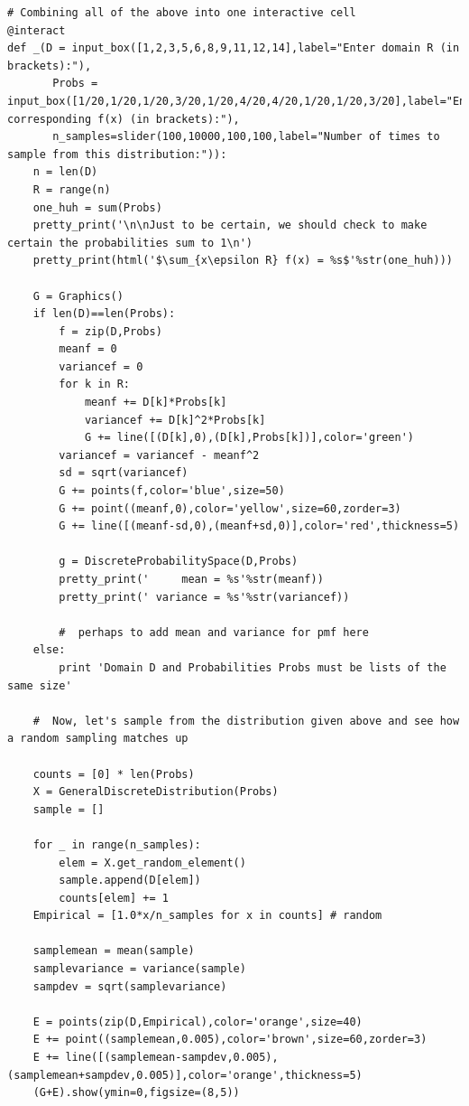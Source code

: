 \documentclass[10pt,]{book}
\theoremstyle{plain}
\theoremstyle{definition}
\theoremstyle{definition}
\theoremstyle{definition}
\numberwithin{equation}{section}
\begin{document}
\begin{lstlisting}[style=sageinput]
# Combining all of the above into one interactive cell
@interact
def _(D = input_box([1,2,3,5,6,8,9,11,12,14],label="Enter domain R (in brackets):"), 
       Probs = input_box([1/20,1/20,1/20,3/20,1/20,4/20,4/20,1/20,1/20,3/20],label="Enter corresponding f(x) (in brackets):"),
       n_samples=slider(100,10000,100,100,label="Number of times to sample from this distribution:")):
    n = len(D)
    R = range(n)
    one_huh = sum(Probs)
    pretty_print('\n\nJust to be certain, we should check to make certain the probabilities sum to 1\n')
    pretty_print(html('$\sum_{x\epsilon R} f(x) = %s$'%str(one_huh)))
    
    G = Graphics()
    if len(D)==len(Probs):
        f = zip(D,Probs)
        meanf = 0
        variancef = 0
        for k in R:
            meanf += D[k]*Probs[k]
            variancef += D[k]^2*Probs[k]
            G += line([(D[k],0),(D[k],Probs[k])],color='green')
        variancef = variancef - meanf^2
        sd = sqrt(variancef)
        G += points(f,color='blue',size=50)
        G += point((meanf,0),color='yellow',size=60,zorder=3)
        G += line([(meanf-sd,0),(meanf+sd,0)],color='red',thickness=5)
    
        g = DiscreteProbabilitySpace(D,Probs)
        pretty_print('     mean = %s'%str(meanf))
        pretty_print(' variance = %s'%str(variancef))
    
        #  perhaps to add mean and variance for pmf here
    else:
        print 'Domain D and Probabilities Probs must be lists of the same size'
    
    #  Now, let's sample from the distribution given above and see how a random sampling matches up

    counts = [0] * len(Probs)
    X = GeneralDiscreteDistribution(Probs)
    sample = []

    for _ in range(n_samples):
        elem = X.get_random_element()
        sample.append(D[elem])
        counts[elem] += 1
    Empirical = [1.0*x/n_samples for x in counts] # random
    
    samplemean = mean(sample)
    samplevariance = variance(sample)
    sampdev = sqrt(samplevariance)
    
    E = points(zip(D,Empirical),color='orange',size=40)
    E += point((samplemean,0.005),color='brown',size=60,zorder=3)
    E += line([(samplemean-sampdev,0.005),(samplemean+sampdev,0.005)],color='orange',thickness=5)    
    (G+E).show(ymin=0,figsize=(8,5))
\end{lstlisting}
\end{document}
